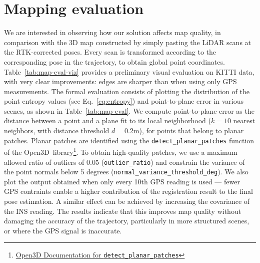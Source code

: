 \section{Mapping evaluation}

We are interested in observing how our solution affects map quality, in comparison with the 3D map constructed by simply pasting the LiDAR scans at the RTK-corrected poses. Every scan is transformed according to the corresponding pose in the trajectory, to obtain global point coordinates. Table~\ref{tab:map-eval-viz} provides a preliminary visual evaluation on KITTI data, with very clear improvements: edges are sharper than when using only GPS measurements. The formal evaluation consists of plotting the distribution of the point entropy values (see Eq.~\ref{eq:entropy}) and point-to-plane error in various scenes, as shown in Table~\ref{tab:map-eval}. We compute point-to-plane error as the distance between a point and a plane fit to its local neighborhood ($k=10$ nearest neighbors, with distance threshold $d=0.2$m), for points that belong to planar patches. Planar patches are identified using the \texttt{detect\_planar\_patches} function of the Open3D~library\footnote{\href{https://www.open3d.org/docs/latest/python_api/open3d.geometry.PointCloud.html\#open3d.geometry.PointCloud.detect_planar_patches}{Open3D Documentation for \texttt{detect\_planar\_patches}}}. To obtain high-quality patches, we use a maximum allowed ratio of outliers of 0.05 (\texttt{outlier\_ratio}) and constrain the variance of the point normals below 5 degrees (\texttt{normal\_variance\_threshold\_deg}).
We also plot the output obtained when only every 10th GPS reading is used --- fewer GPS contraints enable a higher contribution of the registration result to the final pose estimation. A similar effect can be achieved by increasing the covariance of the INS reading. The results indicate that this improves map quality without damaging the accuracy of the trajectory, particularly in more structured scenes, or where the GPS signal is inaccurate.


